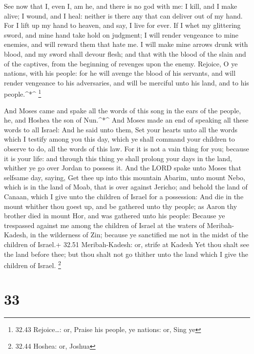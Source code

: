  See now that I, even I, am he, and there is no god with
me: I kill, and I make alive; I wound, and I heal: neither is there any
that can deliver out of my hand.  For I lift up my hand to
heaven, and say, I live for ever.  If I whet my glittering
sword, and mine hand take hold on judgment; I will render vengeance to
mine enemies, and will reward them that hate me.  I will
make mine arrows drunk with blood, and my sword shall devour flesh; and
that with the blood of the slain and of the captives, from the beginning
of revenges upon the enemy.  Rejoice, O ye nations, with
his people: for he will avenge the blood of his servants, and will
render vengeance to his adversaries, and will be merciful unto his land,
and to his people.\^{}*\^{} \footnote{32.43 Rejoice\ldots: or, Praise
  his people, ye nations: or, Sing ye}

 And Moses came and spake all the words of this song in the
ears of the people, he, and Hoshea the son of Nun.\^{}*\^{}
 And Moses made an end of speaking all these words to all
Israel:  And he said unto them, Set your hearts unto all
the words which I testify among you this day, which ye shall command
your children to observe to do, all the words of this law. 
For it is not a vain thing for you; because it is your life: and through
this thing ye shall prolong your days in the land, whither ye go over
Jordan to possess it.  And the LORD spake unto Moses that
selfsame day, saying,  Get thee up into this mountain
Abarim, unto mount Nebo, which is in the land of Moab, that is over
against Jericho; and behold the land of Canaan, which I give unto the
children of Israel for a possession:  And die in the mount
whither thou goest up, and be gathered unto thy people; as Aaron thy
brother died in mount Hor, and was gathered unto his people:
 Because ye trespassed against me among the children of
Israel at the waters of Meribah-Kadesh, in the wilderness of Zin;
because ye sanctified me not in the midst of the children of Israel.+
32.51 Meribah-Kadesh: or, strife at Kadesh  Yet thou shalt
see the land before thee; but thou shalt not go thither unto the land
which I give the children of Israel. \footnote{32.44 Hoshea: or, Joshua}

\hypertarget{section-32}{%
\section{33}\label{section-32}}

